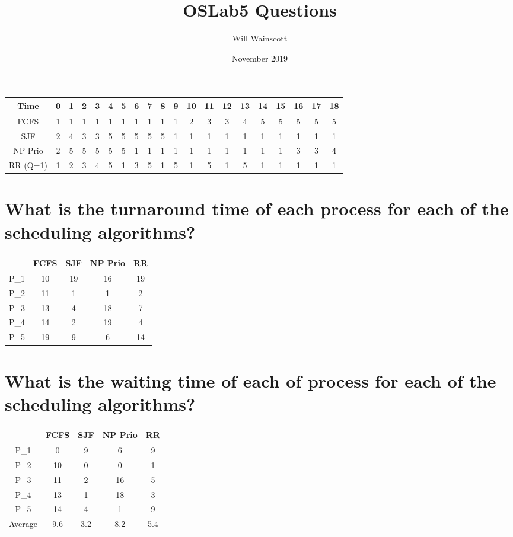 \documentclass{article}
\title{OSLab5 Questions}
\author{Will Wainscott}
\date{November 2019}
\begin{document}
\maketitle



\begin{tabular}{|c||c|c|c|c|c|c|c|c|c|c|c|c|c|c|c|c|c|c|c||} 
\hline
    Time & 0 & 1 & 2 & 3 & 4 & 5 & 6 & 7 & 8 & 9 & 10 & 11 & 12 & 13 & 14 & 15 & 16 & 17 & 18 \\  
\hline\hline
    FCFS & 1 & 1 & 1 & 1 & 1 & 1 & 1 & 1 & 1 & 1 & 2 & 3 & 3 & 4 & 5 & 5 & 5 & 5 & 5 \\ 
\hline
    SJF & 2 & 4 & 3 & 3 & 5 & 5 & 5 & 5 & 5 & 1 & 1 & 1 & 1 & 1 & 1 & 1 & 1 & 1 & 1 \\
\hline
    NP Prio & 2 & 5 & 5 & 5 & 5 & 5 & 1 & 1 & 1 & 1 & 1 & 1 & 1 & 1 & 1 & 1 & 3 & 3 & 4\\
\hline
    RR (Q=1) & 1 & 2 & 3 & 4 & 5 & 1 & 3 & 5 & 1 & 5 & 1 & 5 & 1 & 5 & 1 & 1 & 1 & 1 & 1\\
\hline
\end{tabular}


\section{What is the turnaround time of each process for each of the scheduling algorithms?}

\begin{tabular}{|c|c|c|c|c|}
\hline
     & FCFS & SJF & NP Prio & RR  \\
\hline
    P_1 & 10 & 19 & 16 & 19 \\
\hline
    P_2 & 11 & 1 & 1 & 2 \\
\hline
    P_3 & 13 & 4 & 18 & 7 \\
\hline 
    P_4 & 14 & 2 & 19 & 4 \\
\hline
    P_5 & 19 & 9 & 6 & 14 \\
\hline
\end{tabular}

\section{What is the waiting time of each of process for each of the scheduling algorithms?}

\begin{tabular}{|c|c|c|c|c|}
\hline
     & FCFS & SJF & NP Prio & RR  \\
\hline
    P_1 & 0 & 9 & 6 & 9 \\
\hline
    P_2 & 10 & 0 & 0 & 1 \\
\hline
    P_3 & 11 & 2 & 16 & 5 \\
\hline 
    P_4 & 13 & 1 & 18 & 3 \\
\hline
    P_5 & 14 & 4 & 1 & 9 \\
\hline
    Average & 9.6 & 3.2 & 8.2 & 5.4 \\
\hline
\end{tabular}
\end{document}
